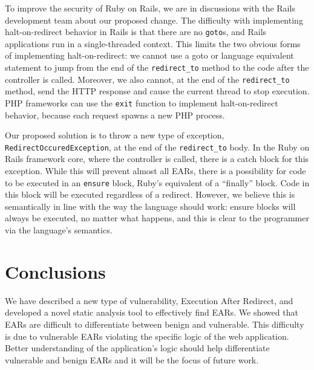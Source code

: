 To improve the security of Ruby on Rails, we are in discussions with the
Rails development team about our proposed change. The difficulty with
implementing halt-on-redirect behavior in Rails is that there are no
\texttt{goto}s, and Rails applications run in a single-threaded context.
This limits the two obvious forms of implementing halt-on-redirect: we
cannot use a go\-to or language equivalent statement to jump from the end
of the \texttt{redirect\_to} method to the code after the controller is
called. Moreover, we also cannot, at the end of the \texttt{redirect\_to}
method, send the HTTP response and cause the current thread to stop
execution. PHP frameworks can use the \texttt{exit} function to implement
halt-on-redirect behavior, because each request spawns a new PHP process.

Our proposed solution is to throw a new type of exception,
\texttt{Redirect\-Occured\-Exception}, at the end of the
\texttt{redirect\_to} body. In the Ruby on Rails framework core, where
the controller is called, there is a catch block for this exception.
While this will prevent almost all EARs, there is a possibility for
code to be executed in an \texttt{ensure} block, Ruby's equivalent of
a ``finally'' block. Code in this block will be executed regardless of a
redirect. However, we believe this is semantically in line with the
way the language should work: ensure blocks will always be executed,
no matter what happens, and this is clear to the programmer via the
language's semantics.


\section{Conclusions}

We have described a new type of vulnerability, Execution After Redirect,
and developed a novel static analysis tool to effectively find EARs. We
showed that EARs are difficult to differentiate between benign and
vulnerable. This difficulty is due to vulnerable EARs violating the
specific logic of the web application. Better understanding of the
application's logic should help differentiate vulnerable and benign EARs
and it will be the focus of future work.



